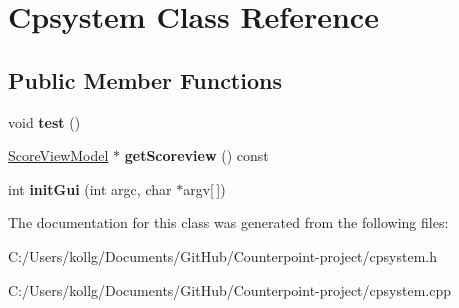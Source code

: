 \hypertarget{class_cpsystem}{}\section{Cpsystem Class Reference}
\label{class_cpsystem}
\subsection*{Public Member Functions}
\begin{DoxyCompactItemize}
\item 
\hypertarget{class_cpsystem_ab113d039f9e7ff50e22983e7fc058c15}{}void {\bfseries test} ()\label{class_cpsystem_ab113d039f9e7ff50e22983e7fc058c15}

\item 
\hypertarget{class_cpsystem_ac5990c28fd6cf16617ef2a43f16ab194}{}\hyperlink{class_score_view_model}{Score\+View\+Model} $\ast$ {\bfseries get\+Scoreview} () const \label{class_cpsystem_ac5990c28fd6cf16617ef2a43f16ab194}

\item 
\hypertarget{class_cpsystem_ae0a0e675cc6dc034c601d92b9ca42ff8}{}int {\bfseries init\+Gui} (int argc, char $\ast$argv\mbox{[}$\,$\mbox{]})\label{class_cpsystem_ae0a0e675cc6dc034c601d92b9ca42ff8}

\end{DoxyCompactItemize}


The documentation for this class was generated from the following files\+:\begin{DoxyCompactItemize}
\item 
C\+:/\+Users/kollg/\+Documents/\+Git\+Hub/\+Counterpoint-\/project/cpsystem.\+h\item 
C\+:/\+Users/kollg/\+Documents/\+Git\+Hub/\+Counterpoint-\/project/cpsystem.\+cpp\end{DoxyCompactItemize}
